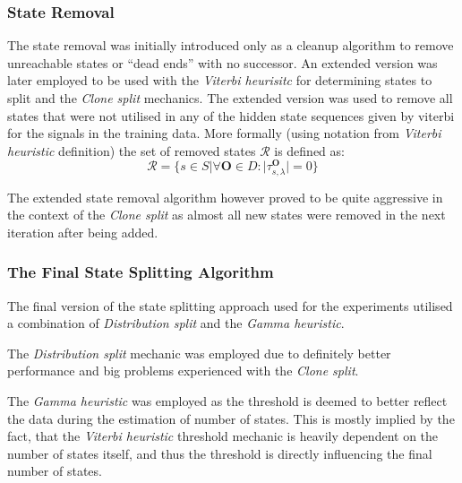 \subsubsection{State Removal}
The state removal was initially introduced only as a cleanup algorithm to remove unreachable states or ``dead ends'' with no successor. An extended version was later employed to be used with the \emph{Viterbi heurisitc} for determining states to split and the \emph{Clone split} mechanics. The extended version was used to remove all states that were not utilised in any of the hidden state sequences given by \gls{viterbi} for the signals in the training data. More formally (using notation from \emph{Viterbi heuristic} definition) the set of removed states $\mathcal{R}$ is defined as:
$$\mathcal{R}=\{s\in S|\forall\mathbf{O}\in D: |\tau_{s,\lambda}^\mathbf{O}|=0\}$$

The extended state removal algorithm however proved to be quite aggressive in the context of the \emph{Clone split} as almost all new states were removed in the next iteration after being added.

\subsubsection{The Final State Splitting Algorithm}
The final version of the state splitting approach used for the experiments utilised a combination of \emph{Distribution split} and the \emph{Gamma heuristic}.

The \emph{Distribution split} mechanic was employed due to definitely better performance and big problems experienced with the \emph{Clone split}.

The \emph{Gamma heuristic} was employed as the threshold is deemed to better reflect the data during the estimation of number of states. This is mostly implied by the fact, that the \emph{Viterbi heuristic} threshold mechanic is heavily dependent on the number of states itself, and thus the threshold is directly influencing the final number of states.



